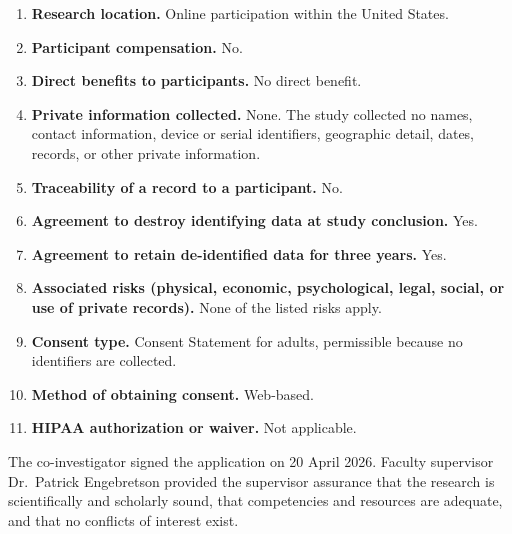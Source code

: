 \begin{enumerate}[leftmargin=2.4em,itemsep=2pt]
  \item \textbf{Research location.} Online participation within the United States.
  \item \textbf{Participant compensation.} No.
  \item \textbf{Direct benefits to participants.} No direct benefit.
  \item \textbf{Private information collected.} None. The study collected no names, contact information, device or serial identifiers, geographic detail, dates, records, or other private information.
  \item \textbf{Traceability of a record to a participant.} No.
  \item \textbf{Agreement to destroy identifying data at study conclusion.} Yes.
  \item \textbf{Agreement to retain de-identified data for three years.} Yes.
  \item \textbf{Associated risks (physical, economic, psychological, legal, social, or use of private records).} None of the listed risks apply.
  \item \textbf{Consent type.} Consent Statement for adults, permissible because no identifiers are collected.
  \item \textbf{Method of obtaining consent.} Web-based.
  \item \textbf{HIPAA authorization or waiver.} Not applicable.
\end{enumerate}

The co-investigator signed the application on 20 April 2026. Faculty supervisor Dr.~Patrick Engebretson provided the supervisor assurance that the research is scientifically and scholarly sound, that competencies and resources are adequate, and that no conflicts of interest exist.
